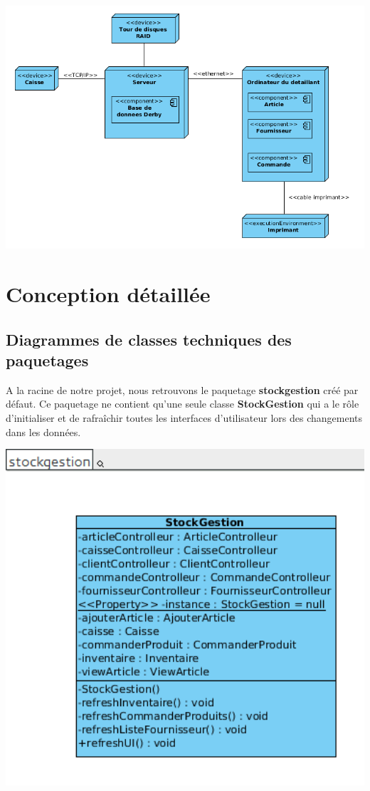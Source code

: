 \begin{center}
	\includegraphics[width=14cm]{./Conception/DiagrammeDeploiement}
\end{center}


\chapter{Conception détaillée}

\section{Diagrammes de classes techniques des paquetages}

A la racine de notre projet, nous retrouvons le paquetage \textbf{stockgestion} créé par défaut. Ce paquetage ne contient qu'une seule classe \textbf{StockGestion} qui a le rôle d'initialiser et de rafraîchir toutes les interfaces d'utilisateur lors des changements dans les données.

\begin{center}
\includegraphics[width=14cm]{./Conception/stockgestion}
\end{center}

